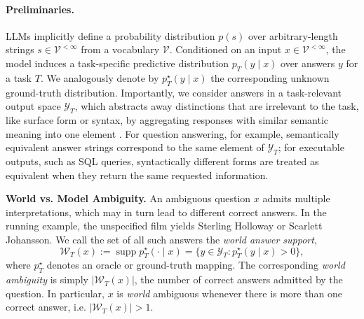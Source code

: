 \paragraph{Preliminaries.}
LLMs implicitly define a probability distribution \(p(s)\) over arbitrary-length strings \(s \in \mathcal{V}^{<\infty}\) from a vocabulary \(\mathcal{V}\). Conditioned on an input \(x \in \mathcal{V}^{<\infty}\), the model induces a task-specific predictive distribution \(p_T(y \mid x)\) over answers \(y\) for a task \(T\). We analogously denote by \(p_T^\star(y \mid x)\) the corresponding unknown ground-truth distribution. Importantly, we consider answers in a task-relevant output space \(\mathcal{Y}_T\), which abstracts away distinctions that are irrelevant to the task, like surface form or syntax, by aggregating responses with similar semantic meaning into one element \cite{tomov2026taskawareness}. For question answering, for example, semantically equivalent answer strings correspond to the same element of \(\mathcal{Y}_T\); for executable outputs, such as SQL queries, syntactically different forms are treated as equivalent when they return the same requested information.



\textbf{World vs. Model Ambiguity.}
An ambiguous question \(x\) admits multiple interpretations, which may in turn lead to different correct answers. 
In the running example, the unspecified film yields Sterling Holloway or Scarlett Johansson. 
We call the set of all such answers the \emph{world answer support},
\[
    \mathcal{W}_T(x)
    :=
    \operatorname{supp} p_T^\star(\cdot \mid x)
    =
    \{y \in \mathcal{Y}_T : p_T^\star(y \mid x) > 0\},
\]
where \(p_T^\star\) denotes an oracle or ground-truth mapping.
The corresponding \emph{world ambiguity} is simply
\(|\mathcal{W}_T(x)|\), the number of correct answers admitted by the question.
In particular, \(x\) is \emph{world} ambiguous whenever there is more than one correct answer, i.e.
\(|\mathcal{W}_T(x)| > 1\).

